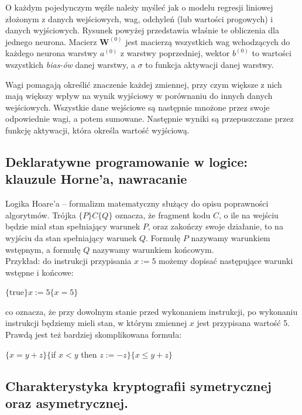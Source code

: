 \documentclass[a4paper,12pt,oneside]{book}
\begin{document}
O każdym pojedynczym węźle należy myśleć jak o modelu regresji liniowej złożonym z danych wejściowych, wag, odchyleń (lub wartości progowych) i danych wyjściowych. Rysunek powyżej przedstawia właśnie te obliczenia dla jednego neurona. Macierz $\mathbf{W}^{(0)}$ jest macierzą wszystkich wag wchodzących do każdego neurona warstwy $a^{(0)}$ z warstwy poprzedniej, wektor $b^(0)$ to wartości wszystkich \textit{bias-ów} danej warstwy, a $\sigma$ to funkcja aktywacji danej warstwy.

Wagi pomagają określić znaczenie każdej zmiennej, przy czym większe z nich mają większy wpływ na wynik wyjściowy w porównaniu do innych danych wejściowych. Wszystkie dane wejściowe są następnie mnożone przez swoje odpowiednie wagi, a potem sumowane. Następnie wyniki są przepuszczane przez funkcję aktywacji, która określa wartość wyjściową.
	
\setcounter{subsection}{52}
\subsection{Deklaratywne programowanie w logice: klauzule Horne'a, nawracanie}
	Logika Hoare’a – formalizm matematyczny służący do opisu poprawności algorytmów.
	Trójka $\{P\}C\{Q\}$ oznacza, że fragment kodu $C$, o ile na wejściu będzie miał stan spełniający warunek $P$, oraz zakończy swoje działanie, to na wyjściu da stan spełniający warunek $Q$. Formułę $P$ nazywamy warunkiem wstępnym, a formułę $Q$ nazywamy warunkiem końcowym.\\
	
	Przykład:
	do instrukcji przypisania $x:=5$ możemy dopisać następujące warunki wstępne i końcowe:
		\begin{center}
				$\{{\text{true}}\}x:=5\{x=5\}$
		\end{center}
	co oznacza, że przy dowolnym stanie przed wykonaniem instrukcji, po wykonaniu instrukcji będziemy mieli stan, w którym zmiennej $x$ jest przypisana wartość 5.\\
	
	
	Prawdą jest też bardziej skomplikowana formuła:\\
	
	\begin{center}
		$\{x=y+z\}\{$if $x<y$ then $ z:=-z\}\{x\leq y+z\}$
	\end{center}

\setcounter{subsection}{65}
\subsection{Charakterystyka kryptografii symetrycznej oraz asymetrycznej. }	
\end{document}
